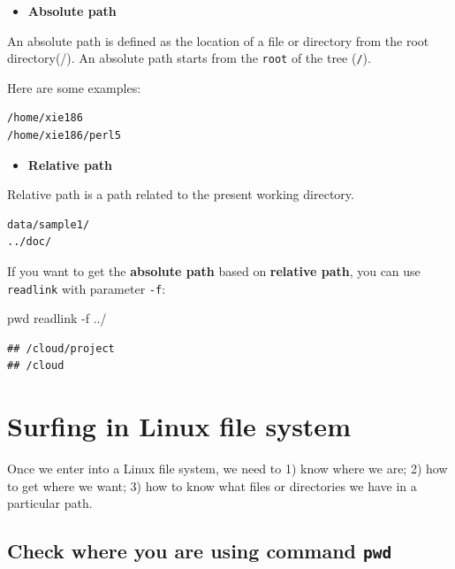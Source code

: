 \documentclass[]{book}
\makeatletter
\newenvironment{Shaded}{\begin{snugshade}}{\end{snugshade}}
\newcommand{\BuiltInTok}[1]{#1}
\newcommand{\FunctionTok}[1]{\textcolor[rgb]{0.00,0.00,0.00}{#1}}
\newcommand{\NormalTok}[1]{#1}
\providecommand{\tightlist}{%
  \setlength{\itemsep}{0pt}\setlength{\parskip}{0pt}}
\newenvironment{kframe}{%
\medskip{}
\setlength{\fboxsep}{.8em}
 \def\at@end@of@kframe{}%
 \ifinner\ifhmode%
  \def\at@end@of@kframe{\end{minipage}}%
  \begin{minipage}{\columnwidth}%
 \fi\fi%
 \def\FrameCommand##1{\hskip\@totalleftmargin \hskip-\fboxsep
 \colorbox{shadecolor}{##1}\hskip-\fboxsep
     \hskip-\linewidth \hskip-\@totalleftmargin \hskip\columnwidth}%
 \MakeFramed {\advance\hsize-\width
   \@totalleftmargin\z@ \linewidth\hsize
   \@setminipage}}%
 {\par\unskip\endMakeFramed%
 \at@end@of@kframe}
\renewenvironment{Shaded}{\begin{kframe}}{\end{kframe}}
\makeatother
\begin{document}
\begin{itemize}
\tightlist
\item
  \textbf{Absolute path}
\end{itemize}

An absolute path is defined as the location of a file or directory from the root directory(/). An absolute path starts from the \texttt{root} of the tree (\texttt{/}).

Here are some examples:

\begin{verbatim}
/home/xie186
/home/xie186/perl5
\end{verbatim}

\begin{itemize}
\tightlist
\item
  \textbf{Relative path}
\end{itemize}

Relative path is a path related to the present working directory.

\begin{verbatim}
data/sample1/
../doc/
\end{verbatim}

If you want to get the \textbf{absolute path} based on \textbf{relative path}, you can use \texttt{readlink} with parameter \texttt{-f}:

\begin{Shaded}
\begin{Highlighting}[]
\BuiltInTok{pwd}
\FunctionTok{readlink}\NormalTok{ -f ../}
\end{Highlighting}
\end{Shaded}

\begin{verbatim}
## /cloud/project
## /cloud
\end{verbatim}

\hypertarget{surfing-in-linux-file-system}{%
\section{Surfing in Linux file system}\label{surfing-in-linux-file-system}}

Once we enter into a Linux file system, we need to 1) know where we are; 2) how to get where we want; 3) how to know what files or directories we have in a particular path.

\hypertarget{check-where-you-are-using-command-pwd}{%
\subsection{\texorpdfstring{Check where you are using command \texttt{pwd}}{Check where you are using command pwd}}\label{check-where-you-are-using-command-pwd}}
\end{document}
